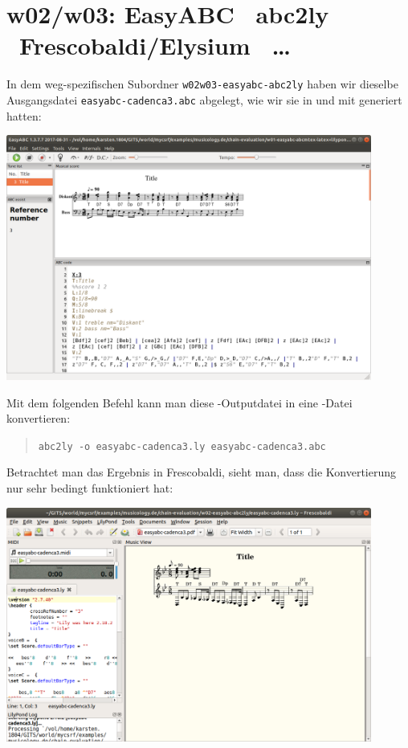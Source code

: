 \section{w02/w03: Easy\-ABC \ra\ abc2ly  \ra\ Frescobaldi/Elysium \ra\ \ldots}\label{w0203}

In dem weg-spezifischen Subordner \texttt{w02w03-easyabc-abc2ly} haben wir dieselbe
Ausgangsdatei \texttt{easyabc-cadenca3.abc} abgelegt, wie wir sie in und mit
 generiert hatten:

\begin{center}
\includegraphics[width=0.9\textwidth]{frontends/easyabc/easyabc-cadenca3.png}
\end{center}

Mit dem folgenden Befehl kann man diese -Outputdatei in eine
-Datei konvertieren:

\begin{quote}\texttt{abc2ly -o easyabc-cadenca3.ly easyabc-cadenca3.abc}\end{quote}

Betrachtet man das Ergebnis in Frescobaldi, sieht man, dass die Konvertierung
nur sehr bedingt funktioniert hat:

\begin{center}
\includegraphics[width=0.9\textwidth]{frontends/easyabc/easyabc-cadenca3-abc-in-frescobaldi.png}
\end{center}


